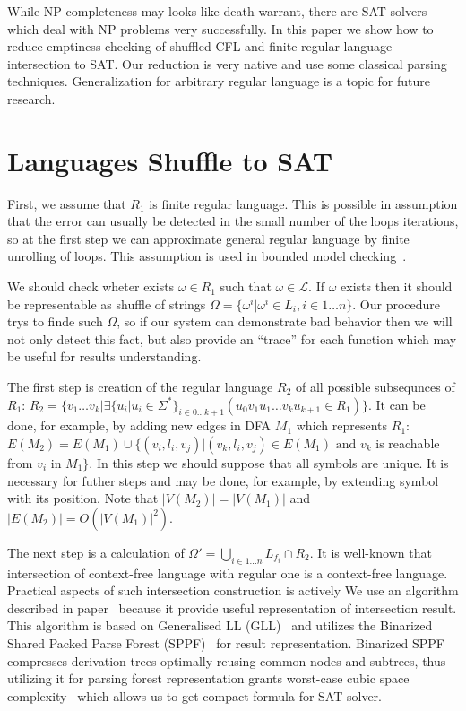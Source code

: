While NP-completeness may looks like death warrant, there are SAT-solvers which deal with NP problems very successfully.
In this paper we show how to reduce emptiness checking of shuffled CFL and finite regular language intersection to SAT.
Our reduction is very native and use some classical parsing techniques.
Generalization for arbitrary regular language is a topic for future research.


\section{Languages Shuffle to SAT}

First, we assume that $R_1$ is finite regular language.
This is possible in assumption that the error can usually be detected in the small number of the loops iterations,
so at the first step we can approximate general regular language by finite unrolling of loops.
This assumption is used in bounded model checking~\cite{BMC}.

We should check wheter exists $\omega \in R_1$ such that $\omega \in \mathcal{L}$.
If $\omega$ exists then it should be representable as shuffle of strings $\Omega = \{\omega^i | \omega^i \in L_i, i\in 1 \dots n\}$.
Our procedure trys to finde such $\Omega$, so if our system can demonstrate bad behavior then we will not only detect this fact, but also provide an ``trace'' for each function which may be useful for results understanding.

The first step is creation of the regular language $R_2$ of all possible subsequnces of $R_1$: $R_2 = \{ v_1 \dots v_k | \exists \{u_i| u_i \in \Sigma^* \}_{i\in 0 \dots k+1} (u_0 v_1 u_1 \dots v_k u_{k+1} \in R_1) \}$.
It can be done, for example, by adding new edges in DFA $M_1$ which represents $R_1$: $E(M_2)=E(M_1) \cup \{(v_i,l_i,v_j) | (v_k,l_i,v_j) \in E(M_1) \text{ and } v_k $ is reachable from $ v_i \text{ in } M_1\}$.
In this step we should suppose that all symbols are unique.
It is necessary for futher steps and may be done, for example, by extending symbol with its position.
Note that $|V(M_2)| = |V(M_1)|$ and $|E(M_2)| = O(|V(M_1)|^2)$.

The next step is a calculation of $\Omega' = \bigcup\limits_{i\in 1 \dots n} L_{f_i} \cap R_2$.
It is well-known that intersection of context-free language with regular one is a context-free language.
Practical aspects of such intersection construction is actively 
We use an algorithm described in paper~\cite{Grigorev} because it provide useful representation of intersection result.
This algorithm is based on Generalised LL (GLL)~\cite{scott2010gll} and utilizes the Binarized Shared Packed Parse Forest (SPPF)~\cite{brnglr, SPPF} for result representation.
Binarized SPPF compresses derivation trees optimally reusing common nodes and subtrees, thus utilizing it for parsing forest representation grants worst-case cubic space complexity~\cite{scott2010gll} which allows us to get compact formula for SAT-solver.

